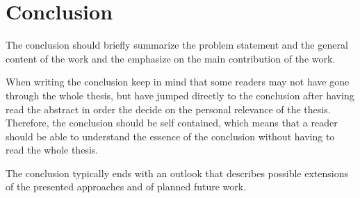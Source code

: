 \chapter{Conclusion}
\label{conclusion}

The conclusion should briefly summarize the problem statement and the general content of the work and the emphasize on the main contribution of the work.

When writing the conclusion keep in mind that some readers may not have gone through the whole thesis, but have jumped directly to the conclusion after having read the abstract in order the decide on the personal relevance of the thesis.
Therefore, the conclusion should be self contained, which means that a reader should be able to understand the essence of the conclusion without having to read the whole thesis.

The conclusion typically ends with an outlook that describes possible extensions of the presented approaches and of planned future work.

